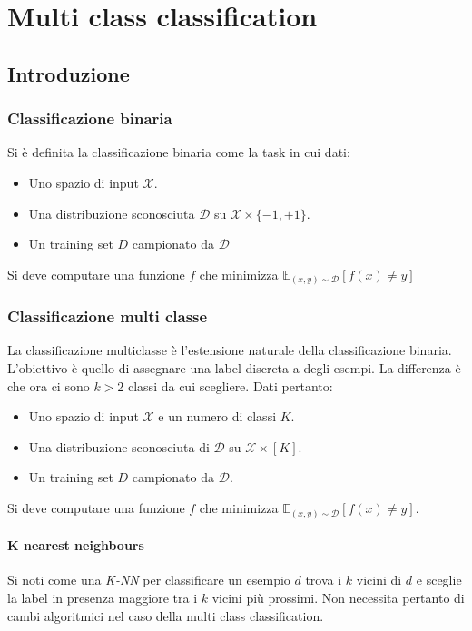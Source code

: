 \chapter{Multi class classification}

\section{Introduzione}

	\subsection{Classificazione binaria}
	Si \`e definita la classificazione binaria come la task in cui dati:
	\begin{itemize}
		\item Uno spazio di input $\mathcal{X}$.
		\item Una distribuzione sconosciuta $\mathcal{D}$ su $\mathcal{X}\times\{-1,+1\}$.
		\item Un training set $D$ campionato da $\mathcal{D}$
	\end{itemize}
	Si deve computare una funzione $f$ che minimizza $\mathbb{E}_{(x,y)\sim\mathcal{D}}[f(x)\neq y]$

	\subsection{Classificazione multi classe}
	La classificazione multiclasse \`e l'estensione naturale della classificazione binaria.
	L'obiettivo \`e quello di assegnare una label discreta a degli esempi.
	La differenza \`e che ora ci sono $k>2$ classi da cui scegliere.
	Dati pertanto:
	\begin{itemize}
		\item Uno spazio di input $\mathcal{X}$ e un numero di classi $K$.
		\item Una distribuzione sconosciuta di $\mathcal{D}$ su $\mathcal{X}\times[K]$.
		\item Un training set $D$ campionato da $\mathcal{D}$.
	\end{itemize}
	Si deve computare una funzione $f$ che minimizza $\mathbb{E}_{(x,y)\sim\mathcal{D}}[f(x)\neq y]$.

		\subsubsection{K nearest neighbours}
		Si noti come una \emph{K-NN} per classificare un esempio $d$ trova i $k$ vicini di $d$ e sceglie la label in presenza maggiore tra i $k$ vicini pi\`u prossimi.
		Non necessita pertanto di cambi algoritmici nel caso della multi class classification.


